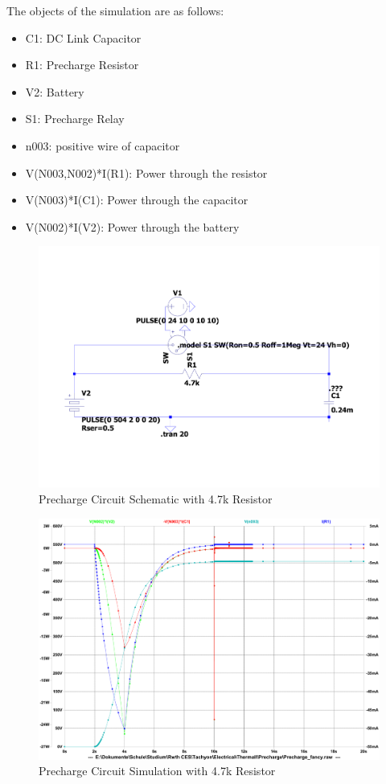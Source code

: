 The objects of the simulation are as follows: 
\begin{itemize}
    \item C1: DC Link Capacitor
    \item R1: Precharge Resistor
    \item V2: Battery
    \item S1: Precharge Relay
    \item n003: positive wire of capacitor
    \item V(N003,N002)*I(R1): Power through the resistor
    \item V(N003)*I(C1): Power through the capacitor
    \item V(N002)*I(V2): Power through the battery
\end{itemize}
    
\begin{figure}[ht]
    \centering
    \includegraphics[width=\linewidth]{texfiles/elec/eimg/PrechargeCircuit}
    \caption{Precharge Circuit Schematic with 4.7k Resistor}
    \label{fig:PrechargeCircuit}
\end{figure}

\begin{figure}[ht]
    \centering
    \includegraphics[width=\linewidth]{texfiles/elec/eimg/PrechargeSimulation4.7k}
    \caption{Precharge Circuit Simulation with 4.7k Resistor}
    \label{fig:PrechargeSimulation4.7k}
\end{figure}

